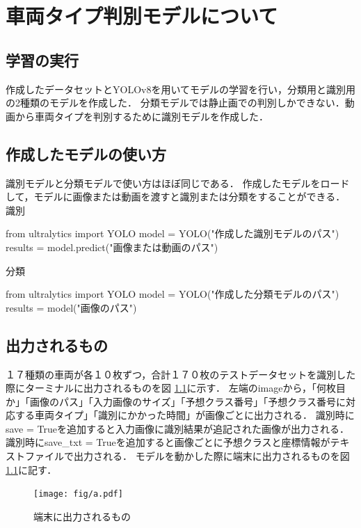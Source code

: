 

\chapter{車両タイプ判別モデルについて}


\section{学習の実行}
作成したデータセットとYOLOv8を用いてモデルの学習を行い，分類用と識別用の2種類のモデルを作成した．
分類モデルでは静止画での判別しかできない．動画から車両タイプを判別するために識別モデルを作成した．


\section{作成したモデルの使い方}
識別モデルと分類モデルで使い方はほぼ同じである．
作成したモデルをロードして，モデルに画像または動画を渡すと識別または分類をすることができる．\\
識別
\begin{verbatimx}
	from ultralytics import YOLO
	model = YOLO("作成した識別モデルのパス")
	results = model.predict("画像または動画のパス")
\end{verbatimx}

分類
\begin{verbatimx}
	from ultralytics import YOLO
	model = YOLO("作成した分類モデルのパス")
	results = model("画像のパス")
\end{verbatimx}

\section{出力されるもの}
１７種類の車両が各１０枚ずつ，合計１７０枚のテストデータセットを識別した際にターミナルに出力されるものを図 \ref{output}に示す．
左端のimageから，「何枚目か」「画像のパス」「入力画像のサイズ」「予想クラス番号」「予想クラス番号に対応する車両タイプ」「識別にかかった時間」が画像ごとに出力される．
識別時にsave = Trueを追加すると入力画像に識別結果が追記された画像が出力される．
識別時にsave\_txt = Trueを追加すると画像ごとに予想クラスと座標情報がテキストファイルで出力される．
モデルを動かした際に端末に出力されるものを図\ref{output}に記す．
\begin{figure}	
	\centering
	\texttt{[image: fig/a.pdf]}
	\caption{端末に出力されるもの}\label{output}
\end{figure}

